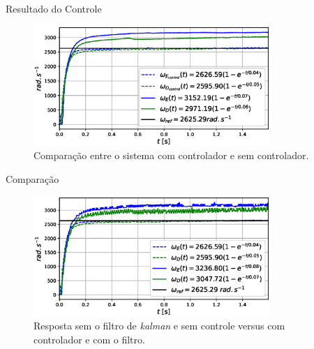 \begin{frame}{Resultado do Controle}

    \begin{figure}
        \centering
        \includegraphics[width=0.8\textwidth]{figuras/resultados/exp01/controlador_vs_sem_controlador100.eps}
        \caption{Comparação entre o sistema com controlador e sem controlador.}
    \end{figure}
    
\end{frame}

\begin{frame}{Comparação}
    \begin{figure}
        \centering
        \includegraphics[width=0.8\textwidth]{figuras/resultados/exp01/antes_vs_depois100.eps}
        \caption{Resposta sem o filtro de \emph{kalman} e sem controle versus com controlador e com o filtro.}
    \end{figure}
\end{frame}